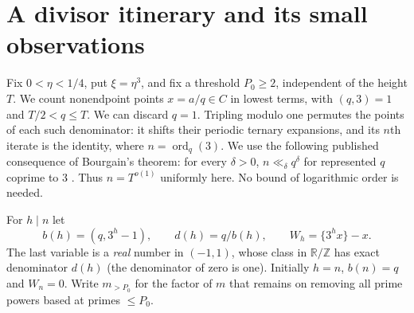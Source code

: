 \section{A divisor itinerary and its small observations}\label{sec:itinerary}

Fix $0<\eta<1/4$, put $\xi=\eta^3$, and fix a threshold
$P_0\ge2$, independent of the height $T$.  We count nonendpoint
points $x=a/q\in C$ in lowest terms, with $(q,3)=1$ and
$T/2<q\le T$.  We can discard $q=1$.  Tripling modulo one permutes
the points of each such denominator: it shifts their periodic ternary
expansions, and its $n$th iterate is the identity, where
$n=\operatorname{ord}_q(3)$.  We use the following published consequence
of Bourgain's theorem: for every $\delta>0$, $n\ll_\delta q^\delta$
for represented $q$ coprime to $3$ \cite[\S6.2]{RSTW2020}. Thus
$n=T^{o(1)}$ uniformly here.  No bound of logarithmic order is needed.

For $h\mid n$ let
\[
 b(h)=(q,3^h-1),\qquad d(h)=q/b(h),\qquad
 W_h=\{3^h x\}-x.
\]
The last variable is a \emph{real} number in $(-1,1)$, whose class in
$\mathbb R/\mathbb Z$ has exact denominator $d(h)$ (the denominator
of zero is one). Initially $h=n$, $b(n)=q$ and $W_n=0$.
Write $m_{>P_0}$ for the factor of $m$ that remains on removing all
prime powers based at primes $\le P_0$.

